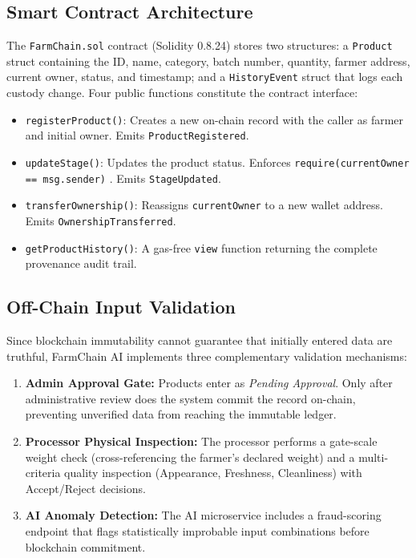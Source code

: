 \documentclass[conference]{IEEEtran}
\begin{document}
\subsection{Smart Contract Architecture}
The \texttt{FarmChain.sol} contract (Solidity 0.8.24) stores two structures: a \texttt{Product} struct containing the ID, name, category, batch number, quantity, farmer address, current owner, status, and timestamp; and a \texttt{HistoryEvent} struct that logs each custody change. Four public functions constitute the contract interface:
\begin{itemize}
    \item \texttt{registerProduct()}: Creates a new on-chain record with the caller as farmer and initial owner. Emits \texttt{ProductRegistered}.
    \item \texttt{updateStage()}: Updates the product status. Enforces \texttt{require(currentOwner == msg.sender)} \cite{atzei2017survey}. Emits \texttt{StageUpdated}.
    \item \texttt{transferOwnership()}: Reassigns \texttt{currentOwner} to a new wallet address. Emits \texttt{OwnershipTransferred}.
    \item \texttt{getProductHistory()}: A gas-free \texttt{view} function returning the complete provenance audit trail.
\end{itemize}

\subsection{Off-Chain Input Validation}
Since blockchain immutability cannot guarantee that initially entered data are truthful, FarmChain AI implements three complementary validation mechanisms:
\begin{enumerate}
    \item \textbf{Admin Approval Gate:} Products enter as \textit{Pending Approval}. Only after administrative review does the system commit the record on-chain, preventing unverified data from reaching the immutable ledger.
    \item \textbf{Processor Physical Inspection:} The processor performs a gate-scale weight check (cross-referencing the farmer's declared weight) and a multi-criteria quality inspection (Appearance, Freshness, Cleanliness) with Accept/Reject decisions.
    \item \textbf{AI Anomaly Detection:} The AI microservice includes a fraud-scoring endpoint that flags statistically improbable input combinations before blockchain commitment.
\end{enumerate}
\end{document}
